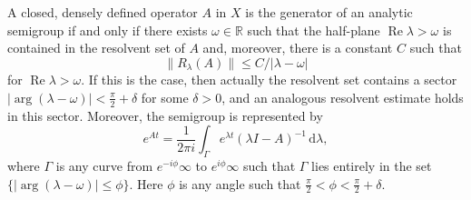 \begin{Theorem}
\label{thm:analytic-generator-sectorial-resolvent}
A closed, densely defined operator $A$ in $X$ is the generator of an analytic semigroup if and only if there exists $\omega\in\mathbb{R}$ such that the half-plane $\operatorname{Re}\lambda>\omega$ is contained in the resolvent set of $A$ and, moreover, there is a constant $C$ such that
\begin{equation}\label{eq:analytic-semigroup-half-plane-resolvent-estimate}
\|R_\lambda(A)\|\leq C/|\lambda-\omega|
\end{equation}
for $\operatorname{Re}\lambda>\omega$. If this is the case, then actually the resolvent set contains a sector $|\arg(\lambda-\omega)|<\frac{\pi}{2}+\delta$ for some $\delta>0$, and an analogous resolvent estimate holds in this sector. Moreover, the semigroup is represented by
\begin{equation}\label{eq:analytic-semigroup-contour-integral-representation}
e^{At}=\dfrac{1}{2\pi i}\int_\Gamma e^{\lambda t}(\lambda I-A)^{-1}\,\mathrm{d}\lambda,
\end{equation}
where $\Gamma$ is any curve from $e^{-i\phi}\infty$ to $e^{i\phi}\infty$ such that $\Gamma$ lies entirely in the set $\{|\arg(\lambda-\omega)|\leq\phi\}$. Here $\phi$ is any angle such that $\frac{\pi}{2}<\phi<\frac{\pi}{2}+\delta$.
\end{Theorem}

\begingroup
\renewcommand{\endProof}{\par}
\endgroup

